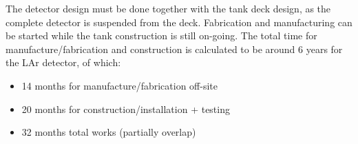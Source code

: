 The detector design must be done together with the tank deck design,
as the complete detector is suspended from the deck.  Fabrication and
manufacturing can be started while the tank construction is still
on-going.  The total time for manufacture/fabrication and construction
is calculated to be around 6 years for the LAr detector, of which:
\begin{itemize}
\item{14 months		for manufacture/fabrication off-site}
\item{20 months		for construction/installation + testing}
\item{32 months		total works (partially overlap)}
\end{itemize}

